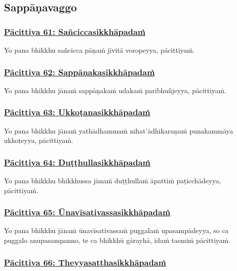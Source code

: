 \subsection{Sappāṇavaggo}
\vspace{0.2cm}

\subsubsection*{\hyperref[exp61]{Pācittiya 61: Sañciccasikkhāpadaṁ}}
\label{pac61}

Yo pana bhikkhu sañcicca pāṇaṁ jīvitā voropeyya, pācittiyaṁ.

\subsubsection*{\hyperref[exp62]{Pācittiya 62: Sappāṇakasikkhāpadaṁ}}
\label{pac62}

Yo pana bhikkhu jānaṁ sappāṇakaṁ udakaṁ paribhuñjeyya, pācittiyaṁ.

\subsubsection*{\hyperref[exp63]{Pācittiya 63: Ukkoṭanasikkhāpadaṁ}}
\label{pac63}

Yo pana bhikkhu jānaṁ yathādhammaṁ nihat'ādhikaraṇaṁ punakammāya ukkoṭeyya, pācittiyaṁ.

\subsubsection*{\hyperref[exp64]{Pācittiya 64: Duṭṭhullasikkhāpadaṁ}}
\label{pac64}

Yo pana bhikkhu bhikkhussa jānaṁ duṭṭhullaṁ āpattiṁ paṭicchādeyya, pācittiyaṁ.

\subsubsection*{\hyperref[exp65]{Pācittiya 65: Ūnavīsativassasikkhāpadaṁ}}
\label{pac65}

Yo pana bhikkhu jānaṁ ūnavīsativassaṁ puggalaṁ upasampādeyya, so ca puggalo anupasampanno, te ca bhikkhū gārayhā, idaṁ tasmiṁ pācittiyaṁ.

\subsubsection*{\hyperref[exp66]{Pācittiya 66: Theyyasatthasikkhāpadaṁ}}
\label{pac66}

